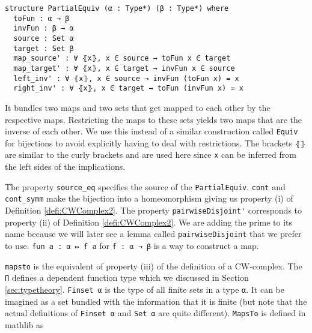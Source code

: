 \begin{lstlisting}
structure PartialEquiv (α : Type*) (β : Type*) where
  toFun : α → β
  invFun : β → α
  source : Set α
  target : Set β
  map_source' : ∀ ⦃x⦄, x ∈ source → toFun x ∈ target
  map_target' : ∀ ⦃x⦄, x ∈ target → invFun x ∈ source
  left_inv' : ∀ ⦃x⦄, x ∈ source → invFun (toFun x) = x
  right_inv' : ∀ ⦃x⦄, x ∈ target → toFun (invFun x) = x
\end{lstlisting}

It bundles two maps and two sets that get mapped to each other by the respective maps.
Restricting the maps to these sets yields two maps that are the inverse of each other.
We use this instead of a similar construction called \lstinline{Equiv}
\href{https://github.com/leanprover-community/mathlib4/blob/93828f4cd10fb8cab31700b110fd2751d36bf1b8/Mathlib/Logic/Equiv/Defs.lean#L60-L65}{\faExternalLink}
for bijections to avoid explicitly having to deal with restrictions.
The brackets \lstinline{⦃⦄} are similar to the curly brackets and are used here since \lstinline{x} can be inferred from the left sides of the implications.

The property \lstinline{source_eq} specifies the source of the \lstinline{PartialEquiv}.
\lstinline{cont} and \lstinline{cont_symm} make the bijection into a homeomorphism giving us property (i) of Definition \ref{defi:CWComplex2}.
The property \lstinline{pairwiseDisjoint'} corresponds to property (ii) of Definition \ref{defi:CWComplex2}.
We are adding the prime to its name because we will later see a lemma called \lstinline{pairwiseDisjoint} that we prefer to use.
\lstinline{fun a : α ↦ f a} for \lstinline{f : α → β} is a way to construct a map.

\lstinline{mapsto} is the equivalent of property (iii) of the definition of a CW-complex.
The \lstinline{Π} defines a dependent function type which we discussed in Section \ref{sec:typetheory}.
\lstinline{Finset α}
\href{https://github.com/leanprover-community/mathlib4/blob/ed125a4216d18273cb1b96d4c846d32b85d74faf/Mathlib/Data/Finset/Basic.lean#L133-L139}{\faExternalLink}
is the type of all finite sets in a type \lstinline{α}.
It can be imagined as a set bundled with the information that it is finite (but note that the actual definitions of \lstinline{Finset α} and \lstinline{Set α} are quite different).
\lstinline{MapsTo} is defined in mathlib as
\href{https://github.com/leanprover-community/mathlib4/blob/ed125a4216d18273cb1b96d4c846d32b85d74faf/Mathlib/Data/Set/Operations.lean#L231-L232}{\faExternalLink}


